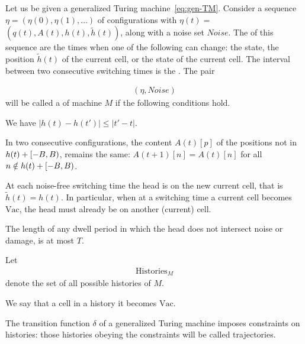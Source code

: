 \documentclass[12pt]{memoir}
\renewcommand{\B}{B}
\newcommand{\h}{h}
\newcommand{\hc}{\tilde h}
\newcommand{\Noise}{\mathit{Noise}}
\newcommand{\Tu}{T}
\newcommand{\Histories}{\mathrm{Histories}}
\newcommand{\Vacant}{\mathrm{Vac}}
\begin{document}
\begin{definition}[History]\label{def:history}
  \begin{sloppypar}
    Let us be given a generalized Turing machine~\eqref{eq:gen-TM}.
    Consider a sequence $\eta = (\eta(0), \eta(1), \dots)$ of configurations with
    \( \eta(t) = \) \( (q(t), A(t), \h(t), \hc(t)) \), along with a noise set $\Noise$.
    The  of this sequence 
are the times when one of the following can change:
the state, the position \( \hc(t) \) of the current cell, or the state of the current cell.
The interval between two consecutive switching times is the .
The pair
      \end{sloppypar}
    \begin{align*}
       (\eta,\Noise)
    \end{align*}
    will be called a  of machine $M$ if the following conditions hold.
        \begin{bullets}
            \item We have $|\h(t) - \h(t')| \le |t' - t|$.

            \item In two consecutive configurations, the content \( A(t)[p] \) of the positions not in
                  $\h(t) + \lint{-\B}{\B}$, remains the same:
                  $A(t+1)[n] = A(t)[n]$ for all $n \notin \h(t) + \lint{-\B}{\B}$.

            \item At each noise-free switching time the head is on the new current cell, that is
\( \hc(t)=\h(t) \).
In particular, when at a switching time a current cell becomes
$\Vacant$, the head must already be on another (current) cell.

            \item The length of any dwell period in which the head does not intersect
noise or damage, is at most \( \Tu \).

        \end{bullets}
    Let
        \begin{align*}
            \Histories_{M}
        \end{align*}
    denote the set of all possible histories of $M$.

We say that a cell  in a history it becomes $\Vacant$.

\end{definition}

The transition function $\delta$ of a generalized Turing machine
imposes constraints on histories: those
histories obeying the constraints will be called trajectories.
\end{document}
